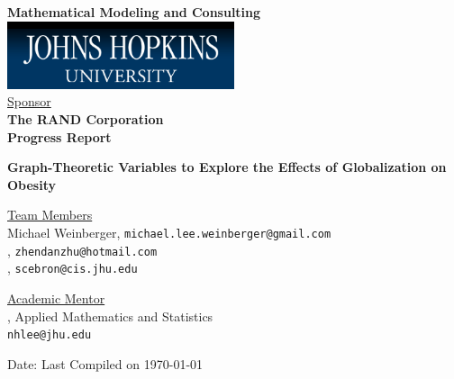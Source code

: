 \documentclass[oneside,12pt]{report}
\begin{document}
\def\thefootnote{\fnsymbol{footnote}}

\thispagestyle{empty}

\def\shiftdowna{0.32in}  %
\def\shiftdownb{0.22in}  %


\begin{center}
\textbf{{\large Mathematical Modeling and Consulting }}\\

\vspace \shiftdowna
\includegraphics[width=0.5\textwidth]{jhu.png}\\

\vspace \shiftdowna
\underline {Sponsor}\\ 
\vspace{5pt}
\textbf{\large The RAND Corporation} \\
\vspace\shiftdowna
\textbf{{Progress Report}}

\vspace \shiftdowna
\textbf{{\Large Graph-Theoretic Variables to Explore the Effects of Globalization on Obesity}}

\vspace{0.35in}
\underline {Team Members}\\

Michael Weinberger, \texttt{michael.lee.weinberger@gmail.com} \\
\vspace{3pt}
, \texttt{zhendanzhu@hotmail.com} \\
\vspace{3pt}
, \texttt{scebron@cis.jhu.edu}

\vspace \shiftdownb
\underline {Academic Mentor} \\
\vspace{5pt}
, Applied Mathematics and Statistics\\
\texttt{nhlee@jhu.edu}


\vspace \shiftdowna
Date: Last Compiled on \today

\end{center}
\end{document}
